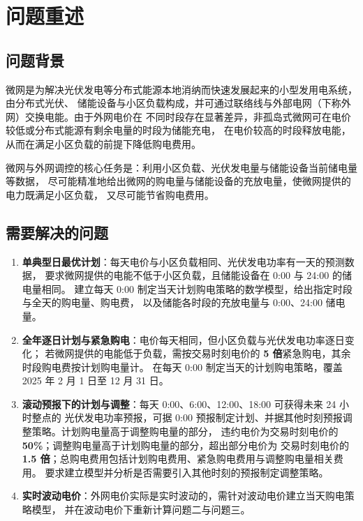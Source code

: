 \section{问题重述}

\subsection{问题背景}

微网是为解决光伏发电等分布式能源本地消纳而快速发展起来的小型发用电系统\nobreak，由分布式光伏\nobreak、
储能设备与小区负载构成\nobreak，并可通过联络线与外部电网（下称外网\nobreak）交换电能\nobreak。由于外网电价在
不同时段存在显著差异\nobreak，非孤岛式微网可在电价较低或分布式能源有剩余电量的时段为储能充电\nobreak，
在电价较高的时段释放电能\nobreak，从而在满足小区负载的前提下降低购电费用\nobreak。

微网与外网调控的核心任务是\nobreak：利用小区负载\nobreak、光伏发电量与储能设备当前储电量等数据\nobreak，
尽可能精准地给出微网的购电量与储能设备的充放电量\nobreak，使微网提供的电力既满足小区负载\nobreak，
又尽可能节省购电费用\nobreak。

\subsection{需要解决的问题}

\begin{enumerate}[label=\textbf{问题\arabic*.}, leftmargin=4em, itemsep=2pt]
\item \textbf{单典型日最优计划}\nobreak：每天电价与小区负载相同\nobreak、光伏发电功率有一天的预测数据\nobreak，
要求微网提供的电能不低于小区负载\nobreak，且储能设备在 0:00 与 24:00 的储电量相同\nobreak。
建立每天 0:00 制定当天计划购电策略的数学模型\nobreak，给出指定时段与全天的购电量\nobreak、购电费\nobreak，
以及储能各时段的充放电量与 0:00\nobreak、24:00 储电量\nobreak。
\item \textbf{全年逐日计划与紧急购电}\nobreak：电价每天相同\nobreak，但小区负载与光伏发电功率逐日变化\nobreak；
若微网提供的电能低于负载\nobreak，需按交易时刻电价的 \textbf{5 倍}紧急购电\nobreak，其余时段购电费按计划购电量计\nobreak。
在每天 0:00 制定当天的计划购电策略\nobreak，覆盖 2025 年 2 月 1 日至 12 月 31 日\nobreak。
\item \textbf{滚动预报下的计划与调整}\nobreak：每天 0:00\nobreak、6:00\nobreak、12:00\nobreak、18:00 可获得未来 24 小时整点的
光伏发电功率预报\nobreak，可据 0:00 预报制定计划\nobreak、并据其他时刻预报调整策略\nobreak。计划购电量高于调整购电量的部分\nobreak，
违约电价为交易时刻电价的 \textbf{50\%}\nobreak；调整购电量高于计划购电量的部分\nobreak，超出部分电价为
交易时刻电价的 \textbf{1.5 倍}\nobreak；总购电费用包括计划购电费用\nobreak、紧急购电费用与调整购电量相关费用\nobreak。
要求建立模型并分析是否需要引入其他时刻的预报制定调整策略\nobreak。
\item \textbf{实时波动电价}\nobreak：外网电价实际是实时波动的\nobreak，需针对波动电价建立当天购电策略模型\nobreak，
并在波动电价下重新计算问题二与问题三\nobreak。
\end{enumerate}

